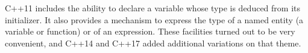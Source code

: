 
C++11 includes the ability to declare a variable whose type is deduced from its initializer. It also provides a mechanism to express the type of a named entity (a variable or function) or of an expression. These facilities turned out to be very convenient, and C++14 and C++17 added additional variations on that theme.






